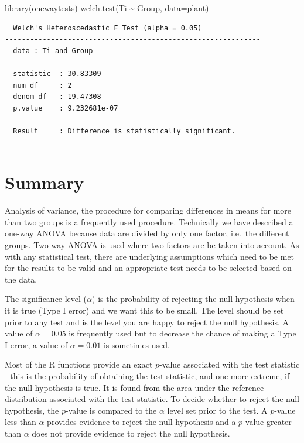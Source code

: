 \documentclass[
  oneside]{krantz}
\newenvironment{Shaded}{\begin{snugshade}}{\end{snugshade}}
\newcommand{\AttributeTok}[1]{\textcolor[rgb]{0.77,0.63,0.00}{#1}}
\newcommand{\FunctionTok}[1]{\textcolor[rgb]{0.00,0.00,0.00}{#1}}
\newcommand{\NormalTok}[1]{#1}
\newcommand{\SpecialCharTok}[1]{\textcolor[rgb]{0.00,0.00,0.00}{#1}}
\begin{document}
\begin{Shaded}
\begin{Highlighting}[]
\FunctionTok{library}\NormalTok{(onewaytests)}
\FunctionTok{welch.test}\NormalTok{(Ti }\SpecialCharTok{\textasciitilde{}}\NormalTok{ Group, }\AttributeTok{data=}\NormalTok{plant)}
\end{Highlighting}
\end{Shaded}

\begin{verbatim}
  Welch's Heteroscedastic F Test (alpha = 0.05) 
------------------------------------------------------------- 
  data : Ti and Group 

  statistic  : 30.83309 
  num df     : 2 
  denom df   : 19.47308 
  p.value    : 9.232681e-07 

  Result     : Difference is statistically significant. 
------------------------------------------------------------- 
\end{verbatim}

\hypertarget{SUManova}{%
\section{Summary}\label{SUManova}}

Analysis of variance, the procedure for comparing differences in means for more than two groups is a frequently used procedure. Technically we have described a one-way ANOVA because data are divided by only one factor, i.e.~the different groups. Two-way ANOVA is used where two factors are be taken into account. As with any statistical test, there are underlying assumptions which need to be met for the results to be valid and an appropriate test needs to be selected based on the data.

The significance level (\(\alpha\)) is the probability of rejecting the null hypothesis when it is true (Type I error) and we want this to be small. The level should be set prior to any test and is the level you are happy to reject the null hypothesis. A value of \(\alpha=0.05\) is frequently used but to decrease the chance of making a Type I error, a value of \(\alpha=0.01\) is sometimes used.

Most of the R functions provide an exact \(p\)-value associated with the test statistic - this is the probability of obtaining the test statistic, and one more extreme, if the null hypothesis is true. It is found from the area under the reference distribution associated with the test statistic. To decide whether to reject the null hypothesis, the \(p\)-value is compared to the \(\alpha\) level set prior to the test. A \(p\)-value less than \(\alpha\) provides evidence to reject the null hypothesis and a \(p\)-value greater than \(\alpha\) does not provide evidence to reject the null hypothesis.
\end{document}
